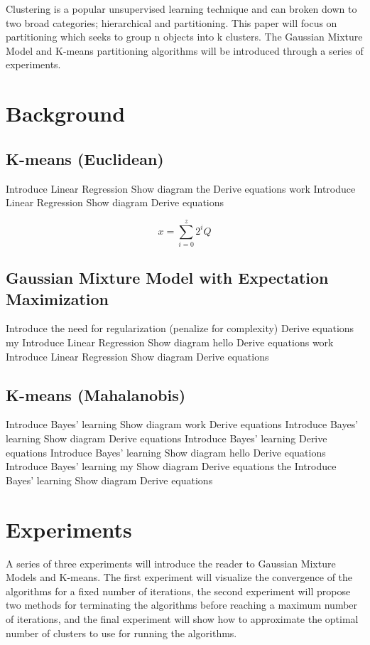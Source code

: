 \documentclass[conference]{IEEEtran}
\begin{document}
Clustering is a popular unsupervised learning technique and can broken down to two broad categories; hierarchical and partitioning.  This paper will focus on partitioning which seeks to group n objects into k clusters.  The Gaussian Mixture Model and K-means partitioning algorithms will be introduced through a series of experiments.  
\section{Background}

\subsection{K-means (Euclidean) }
Introduce Linear Regression
Show diagram the
Derive equations work
Introduce Linear Regression
Show diagram
Derive equations



\begin{equation}
\label{eqn_example}
x = \sum\limits_{i=0}^{z} 2^{i}Q
\end{equation}

\subsection{Gaussian Mixture Model with Expectation Maximization}
Introduce the need for regularization (penalize for complexity)
Derive equations my
Introduce Linear Regression
Show diagram hello
Derive equations work
Introduce Linear Regression
Show diagram
Derive equations

\subsection{K-means (Mahalanobis)}
Introduce Bayes' learning
Show diagram work
Derive equations
Introduce Bayes' learning
Show diagram
Derive equations
Introduce Bayes' learning
Derive equations
Introduce Bayes' learning
Show diagram hello
Derive equations
Introduce Bayes' learning my
Show diagram
Derive equations the
Introduce Bayes' learning
Show diagram
Derive equations


\section{Experiments}

A series of three experiments will introduce the reader to Gaussian Mixture Models and K-means. The first experiment will visualize the convergence of the algorithms for a fixed number of iterations, the second experiment will propose two methods for terminating the algorithms before reaching a maximum number of iterations, and the final experiment will show how to approximate the optimal number of clusters to use for running the algorithms.
\end{document}
